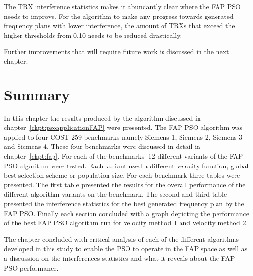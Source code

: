The TRX interference statistics makes it abundantly clear where the FAP PSO needs to improve. For the algorithm to make any progress towards generated frequency plans with lower interference, the amount of TRXs that exceed the higher thresholds from 0.10 needs to be reduced drastically.

Further improvements that will require future work is discussed in the next chapter.

\section{Summary}
In this chapter the results produced by the algorithm discussed in chapter~\ref{chpt:psoapplicationFAP} were presented. The FAP PSO algorithm was applied to four COST 259 benchmarks namely Siemens 1, Siemens 2, Siemens 3 and Siemens 4. These four benchmarks were discussed in detail in chapter~\ref{chpt:fap}. For each of the benchmarks, 12 different variants of the FAP PSO algorithm were tested. Each variant used a different velocity function, global best selection scheme or population size. For each benchmark three tables were presented. The first table presented the results for the overall performance of the different algorithm variants on the benchmark. The second and third table presented the interference statistics for the best generated frequency plan by the FAP PSO. Finally each section concluded with a graph depicting the performance of the best FAP PSO algorithm run for velocity method 1 and velocity method 2.

The chapter concluded with critical analysis of each of the different algorithms developed in this study to enable the PSO to operate in the FAP space as well as a discussion on the interferences statistics and what it reveals about the FAP PSO performance.

